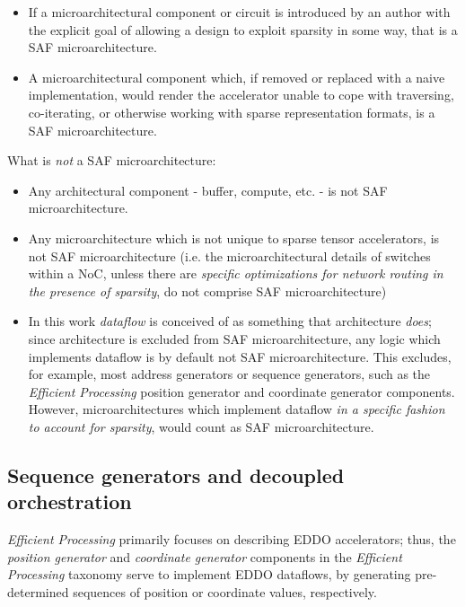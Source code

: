 \begin{itemize}
    \item If a microarchitectural component or circuit is introduced by an author with the explicit goal of allowing a design to exploit sparsity in some way, that is a SAF microarchitecture.
    \item A microarchitectural component which, if removed or replaced with a naive implementation, would render the accelerator unable to cope with traversing, co-iterating, or otherwise working with sparse representation formats, is a SAF microarchitecture.
\end{itemize}

What is \textit{not} a SAF microarchitecture:

\begin{itemize}
    \item Any architectural component - buffer, compute, etc. - is not SAF microarchitecture.
    \item Any microarchitecture which is not unique to sparse tensor accelerators, is not SAF microarchitecture (i.e. the microarchitectural details of switches within a NoC, unless there are \textit{specific optimizations for network routing in the presence of sparsity}, do not comprise SAF microarchitecture)
    \item In this work \textit{dataflow} is conceived of as something that architecture \textit{does}; since architecture is excluded from SAF microarchitecture, any logic which implements dataflow is by default not SAF microarchitecture. This excludes, for example, most address generators or sequence generators, such as the \textit{Efficient Processing} position generator and coordinate generator components. However, microarchitectures which implement dataflow \textit{in a specific fashion to account for sparsity}, would count as SAF microarchitecture.
\end{itemize}

\subsection{Sequence generators and decoupled orchestration}

\textit{Efficient Processing}\cite{szebook} primarily focuses on describing EDDO\cite{buffet} accelerators; thus, the \textit{position generator} and \textit{coordinate generator} components in the \textit{Efficient Processing} taxonomy serve to implement EDDO dataflows, by generating pre-determined sequences of position or coordinate values, respectively.


